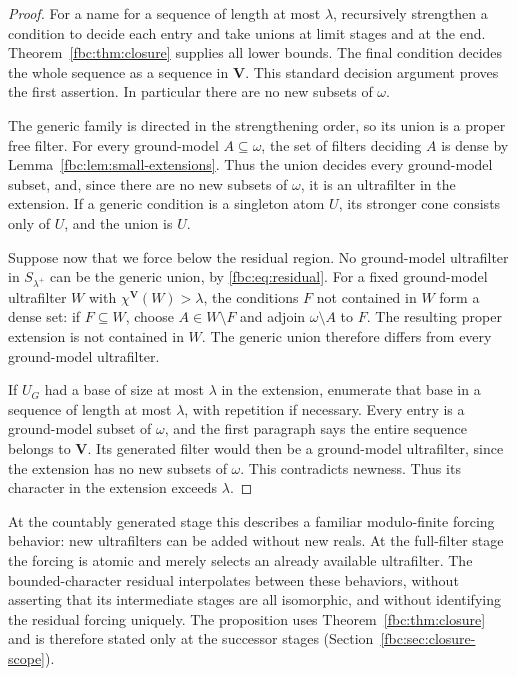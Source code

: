 \documentclass[11pt,letterpaper]{article}
\theoremstyle{definition}
\theoremstyle{remark}
\newcommand{\om}{\omega}
\newcommand{\bV}{\mathbf V}
\begin{document}
\begin{proof}
For a name for a sequence of length at most $\lambda$, recursively
strengthen a condition to decide each entry and take unions at limit
stages and at the end. Theorem~\ref{fbc:thm:closure} supplies all lower
bounds. The final condition decides the whole sequence as a sequence in
$\bV$. This standard decision argument proves the first assertion. In
particular there are no new subsets of $\om$.

The generic family is directed in the strengthening order, so its union
is a proper free filter. For every ground-model $A\subseteq\om$, the
set of filters deciding $A$ is dense by
Lemma~\ref{fbc:lem:small-extensions}. Thus the union decides every
ground-model subset, and, since there are no new subsets of $\om$, it is
an ultrafilter in the extension. If a generic condition is a singleton
atom $U$, its stronger cone consists only of $U$, and the union is $U$.

Suppose now that we force below the residual region. No ground-model
ultrafilter in $S_{\lambda^+}$ can be the generic union, by
\eqref{fbc:eq:residual}. For a fixed ground-model ultrafilter $W$ with
$\chi^{\bV}(W)>\lambda$, the conditions $F$ not contained in $W$ form a
dense set: if $F\subseteq W$, choose $A\in W\setminus F$ and adjoin
$\om\setminus A$ to $F$. The resulting proper extension is not contained
in $W$. The generic union therefore differs from every ground-model
ultrafilter.

If $U_G$ had a base of size at most $\lambda$ in the extension, enumerate
that base in a sequence of length at most $\lambda$, with repetition if
necessary. Every entry is a ground-model subset of $\om$, and the first
paragraph says the entire sequence belongs to $\bV$. Its generated filter
would then be a ground-model ultrafilter, since the extension has no new
subsets of $\om$. This contradicts newness. Thus its character in the
extension exceeds $\lambda$.
\end{proof}

At the countably generated stage this describes a familiar
modulo-finite forcing behavior: new ultrafilters can be added without
new reals. At the full-filter stage the forcing is atomic and merely
selects an already available ultrafilter. The bounded-character residual
interpolates between these behaviors, without asserting that its
intermediate stages are all isomorphic, and without identifying the
residual forcing uniquely. The proposition uses
Theorem~\ref{fbc:thm:closure} and is therefore stated only at the
successor stages (Section~\ref{fbc:sec:closure-scope}).
\end{document}
